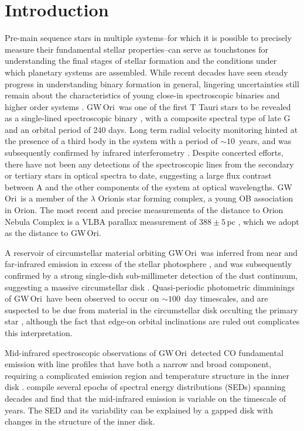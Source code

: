 \documentclass[twocolumn]{aastex61}
\newcommand{\gw}{GW\,Ori}
\begin{document}
\section{Introduction} \label{sec:intro}

Pre-main sequence stars in multiple systems--for which it is possible to precisely measure their fundamental stellar properties--can serve as touchstones for understanding the final stages of stellar formation and the conditions under which planetary systems are assembled. While recent decades have seen steady progress in understanding binary formation in general, lingering uncertainties still remain about the characteristics of young close-in spectroscopic binaries and higher order systems \citep{duchene13}.
\gw\ was one of the first T Tauri stars to be revealed as a single-lined spectroscopic binary \citep{mathieu91}, with a composite spectral type of late G and an orbital period of 240 days. Long term radial velocity monitoring hinted at the presence of a third body in the system with a period of $\sim$$10\,$ years, and was subsequently confirmed by infrared interferometry \citep{berger11}. Despite concerted efforts, there have not been any detections of the spectroscopic lines from the secondary or tertiary stars in optical spectra to date, suggesting a large flux contrast between A and the other components of the system at optical wavelengths. \gw\ is a member of the $\lambda$ Orionis star forming complex, a young OB association \citep{dolan00,dolan01,dolan02} in Orion. The most recent and precise measurements of the distance to Orion Nebula Complex is a VLBA parallax measurement of $388\pm5\,$pc \citep{kounkel17}, which we adopt as the distance to \gw.

A reservoir of circumstellar material orbiting \gw\ was inferred from near and far-infrared emission in excess of the stellar photosphere \citep{mathieu91}, and was subsequently confirmed by a strong single-dish sub-millimeter detection of the dust continuum, suggesting a massive circumstellar disk \citep[$M_\mathrm{disk} \gtrsim 0.1\,M_\odot$;][]{mathieu95}. Quasi-periodic photometric dimminings of \gw\ have been observed to occur on $\sim100\,$ day timescales, and are suspected to be due from material in the circumstellar disk occulting the primary star \citep{shevchenko92,shevchenko98}, although the fact that edge-on orbital inclinations are ruled out complicates this interpretation.

Mid-infrared spectroscopic observations of \gw\ detected CO fundamental emission with line profiles that have both a narrow and broad component, requiring a complicated emission region and temperature structure in the inner disk \citep{najita03}. \citet{fang14} compile several epochs of spectral energy distributions (SEDs) spanning decades and find that the mid-infrared emission is variable on the timescale of years. The SED and its variability can be explained by a gapped disk with changes in the structure of the inner disk.
\end{document}
